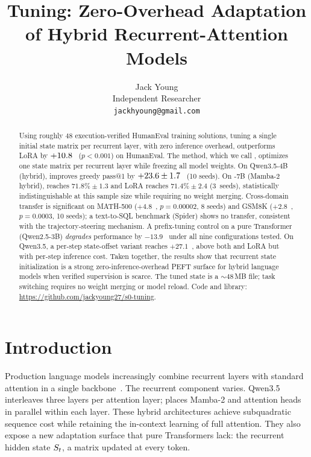 \documentclass{article}
\title{%
  \methodshort Tuning: Zero-Overhead Adaptation of Hybrid Recurrent-Attention Models%
}
\author{%
  Jack Young \\
  Independent Researcher \\
  \texttt{jackhyoung@gmail.com} \\
}
\begin{document}
\maketitle

\begin{abstract}
Using roughly 48 execution-verified HumanEval training solutions, tuning a
single initial state matrix per recurrent layer, with zero inference
overhead, outperforms LoRA by $+10.8$~\pp{} ($p < 0.001$) on HumanEval.
The method, which we call \method, optimizes one state matrix per recurrent
layer while freezing all model weights.
On Qwen3.5-4B (\gdn hybrid), \method improves greedy pass@1 by
$+23.6 \pm 1.7$~\pp{} (10 seeds).
On \falcon-7B (Mamba-2 hybrid), \methodshort reaches $71.8\% \pm 1.3$ and
LoRA reaches $71.4\% \pm 2.4$ (3~seeds), statistically indistinguishable at this sample size while requiring no weight merging.
Cross-domain transfer is significant on MATH-500 ($+4.8$~\pp, $p = 0.00002$, 8 seeds) and GSM8K ($+2.8$~\pp, $p = 0.0003$, 10 seeds); a text-to-SQL benchmark (Spider) shows no transfer, consistent with the trajectory-steering mechanism.
A prefix-tuning control on a pure Transformer (Qwen2.5-3B) \emph{degrades}
performance by $-13.9$~\pp{} under all nine configurations tested.
On Qwen3.5, a per-step state-offset variant reaches $+27.1$~\pp{}, above both
\methodshort and LoRA but with per-step inference cost. Taken together, the
results show that recurrent state initialization is a strong
zero-inference-overhead PEFT surface for hybrid language models when verified
supervision is scarce.
The tuned state is a ${\sim}$48\,MB file; task switching requires no weight merging or model reload.
Code and library: \url{https://github.com/jackyoung27/s0-tuning}.
\end{abstract}

\section{Introduction}
\label{sec:intro}

Production language models increasingly combine recurrent layers with standard
attention in a single backbone~\cite{gated_deltanet,mamba2,falconh1}.
The recurrent component varies.
Qwen3.5 interleaves three \gdn layers per attention layer; \falcon places
Mamba-2 and attention heads in parallel within each layer.
These hybrid architectures achieve subquadratic sequence cost while retaining
the in-context learning of full attention. They also expose a new adaptation
surface that pure Transformers lack: the recurrent hidden state $S_t$, a
matrix updated at every token.
\end{document}
